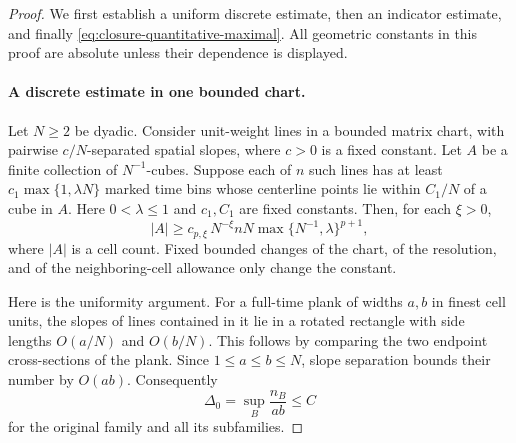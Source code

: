 \begin{proof}
We first establish a uniform discrete estimate, then an indicator estimate,
and finally \eqref{eq:closure-quantitative-maximal}.  All geometric constants
in this proof are absolute unless their dependence is displayed.

\paragraph{A discrete estimate in one bounded chart.}
Let \(N\ge2\) be dyadic.  Consider unit-weight lines in a bounded matrix
chart, with pairwise \(c/N\)-separated spatial slopes, where \(c>0\) is
a fixed constant.  Let \(A\) be a finite collection of \(N^{-1}\)-cubes.
Suppose each of \(n\) such lines has at least
\(c_1\max\{1,\lambda N\}\) marked time bins whose centerline points
lie within \(C_1/N\) of a cube in \(A\).  Here \(0<\lambda\le1\)
and \(c_1,C_1\) are fixed constants.  Then, for each \(\xi>0\),
\begin{equation}
  |A|\ge c_{p,\xi}\,N^{-\xi} nN
                    \max\{N^{-1},\lambda\}^{p+1},
  \label{eq:closure-discrete-set}
\end{equation}
where \(|A|\) is a cell count.  Fixed bounded changes of the chart,
of the resolution, and of the neighboring-cell allowance only change
the constant.

Here is the uniformity argument.  For a full-time plank of widths
\(a,b\) in finest cell units, the slopes of lines contained in it lie
in a rotated rectangle with side lengths \(O(a/N)\) and \(O(b/N)\).
This follows by comparing the two endpoint cross-sections of the plank.
Since \(1\le a\le b\le N\), slope separation bounds their number by
\(O(ab)\).  Consequently
\begin{equation}
  \Delta_0=\sup_B\frac{n_B}{ab}\le C
  \label{eq:closure-separated-clustering}
\end{equation}
for the original family and all its subfamilies.


\end{proof}
